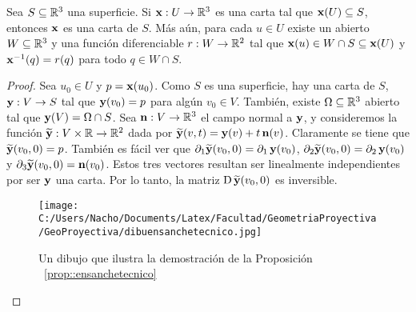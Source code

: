 \begin{prop}\label{prop::ensanchetecnico}
Sea $S\subseteq\mathbb{R}^3$ una superficie. Si $\operatorname{\mathbf{x}}:U\to\mathbb{R}^3$ es una carta tal que $\operatorname{\mathbf{x}}(U)\subseteq S$, entonces $\operatorname{\mathbf{x}}$ es una carta de $S$. Más aún, para cada $u\in U$ existe un abierto $W\subseteq\mathbb{R}^3$ y una función diferenciable $r:W\to\mathbb{R}^2$ tal que $\operatorname{\mathbf{x}}(u)\in W\cap S\subseteq\operatorname{\mathbf{x}}(U)$ y $\operatorname{\mathbf{x}}^{-1}(q)=r(q)$ para todo $q\in W\cap S$.
\begin{proof}
Sea $u_0\in U$ y $p=\operatorname{\mathbf{x}}(u_0)$. Como $S$ es una superficie, hay una carta de $S$, $\operatorname{\mathbf{y}}:V\to S$ tal que $\operatorname{\mathbf{y}}(v_0)=p$ para algún $v_0\in V$. También, existe $\Omega\subseteq\mathbb{R}^3$ abierto tal que $\operatorname{\mathbf{y}}(V)=\Omega\cap S$. Sea $\operatorname{\mathbf{n}}:V\to\mathbb{R}^3$ el campo normal a $\operatorname{\mathbf{y}}$, y consideremos la función $\widetilde{\operatorname{\mathbf{y}}}:V\times\mathbb{R}\to\mathbb{R}^2$ dada por $\widetilde{\operatorname{\mathbf{y}}}(v,t)=\operatorname{\mathbf{y}}(v)+t\operatorname{\mathbf{n}}(v)$. Claramente se tiene que $\widetilde{\operatorname{\mathbf{y}}}(v_0,0)=p$. También es fácil ver que $\partial_1\widetilde{\operatorname{\mathbf{y}}}(v_0,0)=\partial_1\operatorname{\mathbf{y}}(v_0)$, $\partial_2\widetilde{\operatorname{\mathbf{y}}}(v_0,0) = \partial_2\operatorname{\mathbf{y}}(v_0)$ y $\partial_3\widetilde{\operatorname{\mathbf{y}}}(v_0,0)=\operatorname{\mathbf{n}}(v_0)$. Estos tres vectores resultan ser linealmente independientes por ser $\operatorname{\mathbf{y}}$ una carta. Por lo tanto, la matriz $\operatorname{\mathrm{D}}\widetilde{\operatorname{\mathbf{y}}}(v_0,0)$ es inversible.

\begin{figure}[h]
	\centering
		\texttt{[image: C:/Users/Nacho/Documents/Latex/Facultad/GeometriaProyectiva/GeoProyectiva/dibuensanchetecnico.jpg]}
	\caption{Un dibujo que ilustra la demostración de la Proposición ~\ref{prop::ensanchetecnico}}
	\label{fig:dibuensanchetecnico}
\end{figure}


\end{proof}
\end{prop}
